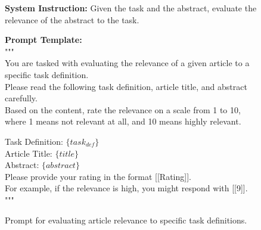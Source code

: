 \begin{figure}[ht]
\begin{tcolorbox}[
colframe=black!75!white,
colback=white, sharp corners,
boxrule=0.8pt, width=\textwidth,
title=Prompts of the Relevance Evaluation to Task Definitions
]
\small
\textbf{System Instruction:}  
Given the task and the abstract, evaluate the relevance of the abstract to the task.  

\textbf{Prompt Template:}\\
"""\\
You are tasked with evaluating the relevance of a given article to a specific task definition. \\
Please read the following task definition, article title, and abstract carefully. \\
Based on the content, rate the relevance on a scale from 1 to 10, \\where 1 means not relevant at all, 
and 10 means highly relevant.

Task Definition: $\{task_{def}\}$ \\
Article Title: $\{title\}$ \\
Abstract: $\{abstract\}$ \\

Please provide your rating in the format [[Rating]].\\For example, if the relevance is high, you might respond with [[9]].
"""
\end{tcolorbox}
\caption{Prompt for evaluating article relevance to specific task definitions.}
\label{fig:prompt_relevance_task_eval}
\end{figure}
